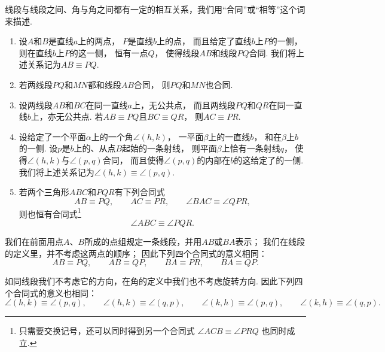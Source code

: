 \begin{axiom}[合同公理]\label{axiom:欧氏几何.合同公理}
线段与线段之间、角与角之间都有一定的相互关系，我们用“合同”或“相等”这个词来描述.
\begin{enumerate}
\item 设\(A\)和\(B\)是直线\(a\)上的两点，
\(P\)是直线\(b\)上的点，
而且给定了直线\(b\)上\(P\)的一侧，
则在直线\(b\)上\(P\)的这一侧，
恒有一点\(Q\)，
使得线段\(AB\)和线段\(PQ\)合同.
我们将上述关系记为\(AB \equiv PQ\).

\item 若两线段\(PQ\)和\(MN\)都和线段\(AB\)合同，
则\(PQ\)和\(MN\)也合同.

\item 设两线段\(AB\)和\(BC\)在同一直线\(a\)上，无公共点，
而且两线段\(PQ\)和\(QR\)在同一直线\(b\)上，亦无公共点.
若\(AB \equiv PQ\)且\(BC \equiv QR\)，
则\(AC \equiv PR\).

\item 设给定了一个平面\(\alpha\)上的一个角\(\angle(h,k)\)，
一平面\(\beta\)上的一直线\(b\)，
和在\(\beta\)上\(b\)的一侧.
设\(p\)是\(b\)上的、从点\(B\)起始的一条射线，
则平面\(\beta\)上恰有一条射线\(q\)，
使得\(\angle(h,k)\)与\(\angle(p,q)\)合同，
而且使得\(\angle(p,q)\)的内部在\(b\)的这给定了的一侧.
我们将上述关系记为\(\angle(h,k) \equiv \angle(p,q)\).

\item 若两个三角形\(ABC\)和\(PQR\)有下列合同式
\begin{equation*}
AB \equiv PQ, \qquad
AC \equiv PR, \qquad
\angle BAC \equiv \angle QPR,
\end{equation*}
则也恒有合同式\footnote{%
只需要交换记号，还可以同时得到另一个合同式
\(\angle ACB \equiv \angle PRQ\)
也同时成立.
}
\begin{equation*}
\angle ABC \equiv \angle PQR.
\end{equation*}
\end{enumerate}
\end{axiom}

我们在前面用点\(A\)、\(B\)所成的点组规定一条线段，并用\(AB\)或\(BA\)表示；
我们在线段的定义里，并不考虑这两点的顺序；
因此下列四个合同式的意义相同：
\begin{equation*}
AB \equiv PQ, \qquad
AB \equiv QP, \qquad
BA \equiv PR, \qquad
BA \equiv QP.
\end{equation*}

如同线段我们不考虑它的方向，在角的定义中我们也不考虑旋转方向.
因此下列四个合同式的意义也相同：
\begin{equation*}
\angle(h,k) \equiv \angle(p,q), \qquad
\angle(h,k) \equiv \angle(q,p), \qquad
\angle(k,h) \equiv \angle(p,q), \qquad
\angle(k,h) \equiv \angle(q,p).
\end{equation*}

